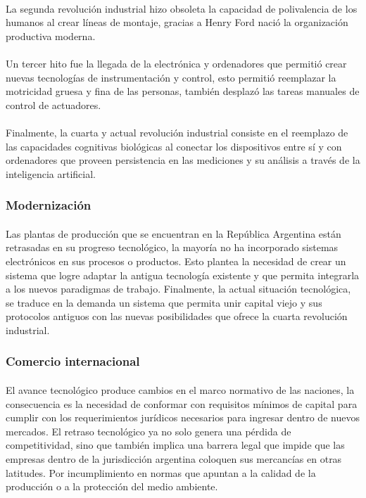 	\paragraph{} La segunda revolución industrial hizo obsoleta la capacidad de polivalencia de los humanos al crear líneas de montaje, gracias a Henry Ford nació la organización productiva moderna.
	\paragraph{} Un tercer hito fue la llegada de la electrónica y ordenadores que permitió crear nuevas tecnologías de instrumentación y control, esto permitió reemplazar la motricidad gruesa y fina de las personas, también desplazó las tareas manuales de control de actuadores. 
	\paragraph{}Finalmente, la cuarta y actual revolución industrial consiste en el reemplazo de las capacidades cognitivas biológicas al conectar los dispositivos entre sí y con ordenadores que proveen persistencia en las mediciones y su análisis a través de la inteligencia artificial.
	
	\subsubsection{Modernización}

		\paragraph{} Las plantas de producción que se encuentran en la República Argentina están retrasadas en su progreso tecnológico, la mayoría no ha incorporado sistemas electrónicos en sus procesos o productos. Esto plantea la necesidad de crear un sistema que logre adaptar la antigua tecnología existente y que permita integrarla a los nuevos paradigmas de trabajo. Finalmente, la actual situación tecnológica, se traduce en la demanda un sistema que permita unir capital viejo y sus protocolos antiguos con las nuevas posibilidades que ofrece la cuarta revolución industrial.

	\subsubsection{Comercio internacional}
		\paragraph{} El avance tecnológico produce cambios en el marco normativo de las naciones, la consecuencia es la necesidad de conformar con requisitos mínimos de capital para cumplir con los requerimientos jurídicos necesarios para ingresar dentro de nuevos mercados. El retraso tecnológico ya no solo genera una pérdida de competitividad, sino que también implica una barrera legal que impide que las empresas dentro de la jurisdicción argentina coloquen sus mercancías en otras latitudes. Por incumplimiento en normas que apuntan a la calidad de la producción o a la protección del medio ambiente.
